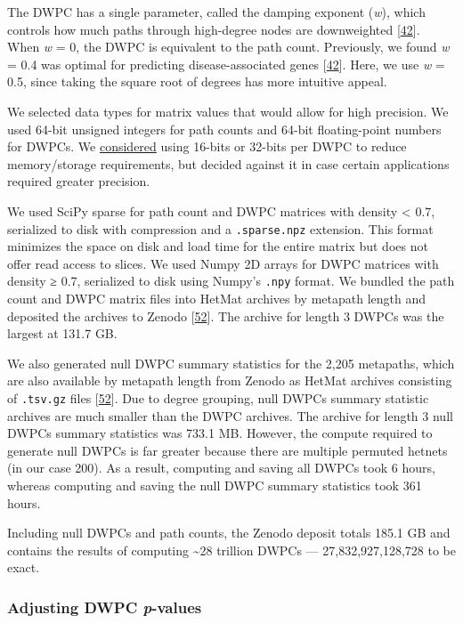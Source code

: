 The DWPC has a single parameter, called the damping exponent (\emph{w}), which controls how much paths through high-degree nodes are downweighted {[}\protect\hyperlink{ref-WkPlH1ds}{42}{]}.
When \emph{w} = 0, the DWPC is equivalent to the path count.
Previously, we found \emph{w} = 0.4 was optimal for predicting disease-associated genes {[}\protect\hyperlink{ref-WkPlH1ds}{42}{]}.
Here, we use \emph{w} = 0.5, since taking the square root of degrees has more intuitive appeal.

We selected data types for matrix values that would allow for high precision.
We used 64-bit unsigned integers for path counts and 64-bit floating-point numbers for DWPCs.
We \href{https://github.com/greenelab/connectivity-search-analyses/pull/91}{considered} using 16-bits or 32-bits per DWPC to reduce memory/storage requirements,
but decided against it in case certain applications required greater precision.

We used SciPy sparse for path count and DWPC matrices with density \textless{} 0.7, serialized to disk with compression and a \texttt{.sparse.npz} extension.
This format minimizes the space on disk and load time for the entire matrix but does not offer read access to slices.
We used Numpy 2D arrays for DWPC matrices with density ≥ 0.7, serialized to disk using Numpy's \texttt{.npy} format.
We bundled the path count and DWPC matrix files into HetMat archives by metapath length and deposited the archives to Zenodo {[}\protect\hyperlink{ref-pkJqqM2W}{52}{]}.
The archive for length 3 DWPCs was the largest at 131.7 GB.

We also generated null DWPC summary statistics for the 2,205 metapaths,
which are also available by metapath length from Zenodo as HetMat archives consisting of \texttt{.tsv.gz} files {[}\protect\hyperlink{ref-pkJqqM2W}{52}{]}.
Due to degree grouping, null DWPCs summary statistic archives are much smaller than the DWPC archives.
The archive for length 3 null DWPCs summary statistics was 733.1 MB.
However, the compute required to generate null DWPCs is far greater because there are multiple permuted hetnets (in our case 200).
As a result, computing and saving all DWPCs took 6 hours,
whereas computing and saving the null DWPC summary statistics took 361 hours.

Including null DWPCs and path counts, the Zenodo deposit totals 185.1 GB and contains the results of computing \textasciitilde28 trillion DWPCs --- 27,832,927,128,728 to be exact.

\hypertarget{adjusting-dwpc-p-values}{%
\subsubsection{\texorpdfstring{Adjusting DWPC \emph{p}-values}{Adjusting DWPC p-values}}\label{adjusting-dwpc-p-values}}

